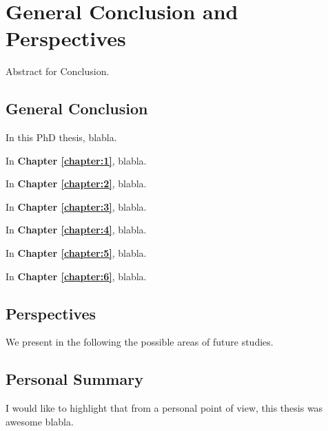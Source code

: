 
\chapter{General Conclusion and Perspectives}
\label{chapter:conclusion}

Abstract for Conclusion.

\graphicspath{{2-Chapters/6-Chapter/Images/}}

\section{General Conclusion}

In this PhD thesis, blabla.


In \textbf{Chapter \ref{chapter:1}}, blabla.

In \textbf{Chapter \ref{chapter:2}}, blabla.

In \textbf{Chapter \ref{chapter:3}}, blabla.

In \textbf{Chapter \ref{chapter:4}}, blabla.

In \textbf{Chapter \ref{chapter:5}}, blabla.

In \textbf{Chapter \ref{chapter:6}}, blabla.


\section{Perspectives}

We present in the following the possible areas of future studies.



\section{Personal Summary}

I would like to highlight that from a personal point of view, this thesis was awesome blabla.


